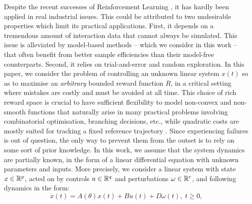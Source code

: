 \documentclass{article}
\begin{document}
Despite the recent successes of Reinforcement Learning \citep[e.g.][]{mnih2015humanlevel,Silver1140}, it has hardly been applied in real industrial issues. This could be attributed to two undesirable properties which limit its practical applications. First, it depends on a tremendous amount of interaction data that cannot always be simulated. This issue is alleviated by model-based methods -- which we consider in this work -- that often benefit from better sample efficiencies than their model-free counterparts. Second, it relies on trial-and-error and random exploration. In this paper, we consider the problem of controlling an unknown linear system $x(t)$ so as to maximise an \emph{arbitrary} bounded reward function $R$, in a critical setting where mistakes are costly and must be avoided at all time. 
This choice of rich reward space is crucial to have sufficient flexibility to model non-convex and non-smooth functions that naturally arise in many practical problems involving combinatorial optimisation, branching decisions, etc., while quadratic costs are mostly suited for tracking a fixed reference trajectory \citep[e.g.][]{Kumar2013}.
Since experiencing failures is out of question, the only way to prevent them from the outset is to rely on some sort of prior knowledge. In this work, we assume that the system dynamics are partially known, in the form of a linear differential equation with unknown parameters and inputs. More precisely, we consider a linear system with state $x\in\mathbb{R}^p$, acted on by controls $u\in\mathbb{R}^q$ and perturbations $\omega\in\mathbb{R}^r$, and following dynamics in the form:
\begin{equation}
\label{eq:dynamics}
\dot{x}(t)=A(\theta)x(t) + B u(t) + D \omega(t),\;t\geq0,
\end{equation}
\end{document}
